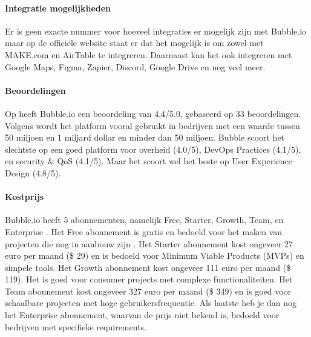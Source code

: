 \paragraph{Integratie mogelijkheden}
Er is geen exacte nummer voor hoeveel integraties er mogelijk zijn met Bubble.io maar op de officiële website \textcite{Bubble2024a} 
staat er dat het mogelijk is om zowel met MAKE.com en AirTable te integreren. Daarnaast kan het ook integreren met Google Maps, Figma, Zapier, Discord, Google Drive en nog veel meer.

\paragraph{Beoordelingen}
Op \textcite{Gartner2024} heeft Bubble.io een beoordeling van 4.4/5.0, gebaseerd op 33 beoordelingen. Volgens \textcite{Gartner2024}
wordt het platform vooral gebruikt in bedrijven met een waarde tussen 50 miljoen en 1 miljard dollar en minder dan 50 miljoen.
Bubble scoort het slechtste op een goed platform voor overheid (4.0/5), DevOps Practices (4.1/5), en security \& QoS  (4.1/5). Maar het scoort wel
het beste op User Experience Design (4.8/5).

\paragraph{Kostprijs}
Bubble.io heeft 5 abonnementen, namelijk Free, Starter, Growth, Team, en Enterprise \autocite{Bubble2024}.
Het Free abonnement is gratis en bedoeld voor het maken van projecten die nog in aanbouw zijn \autocite{Bubble2024}.
Het Starter abonnement kost ongeveer 27 euro per maand (\$ 29) en is bedoeld voor Minimum Viable Products (MVPs) en simpele tools.
Het Growth abonnement kost ongeveer 111 euro per maand (\$ 119). Het is goed voor consumer projects met complexe functionaliteiten.
Het Team abonnement kost ongeveer 327 euro per maand (\$ 349) en is goed voor schaalbare projecten met hoge gebruikersfrequentie. Als laatste heb je dan nog
het Enterprise abonnement, waarvan de prijs niet bekend is, bedoeld voor bedrijven met specifieke requirements.

\pagebreak
